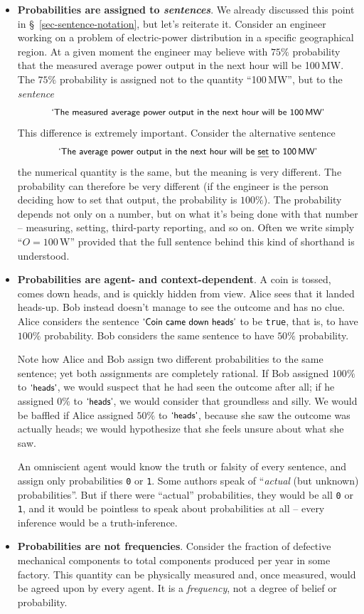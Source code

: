 \documentclass[
  a4paper,
  DIV=11,
  numbers=noendperiod,
  oneside]{scrreprt}
\begin{document}
\begin{itemize}
\item
  {\textbf{ Probabilities are assigned to
  \emph{sentences}}}. We already discussed this point in
  §~\ref{sec-sentence-notation}, but let's reiterate it. Consider an
  engineer working on a problem of electric-power distribution in a
  specific geographical region. At a given moment the engineer may
  believe with \(75\%\) probability that the measured average power
  output in the next hour will be 100\,MW. The \(75\%\) probability is
  assigned not to the quantity ``100\,MW'', but to the \emph{sentence}
  \[
  \textsf{\small`The measured average power output in the next hour will be 100\,MW'}
  \] This difference is extremely important. Consider the alternative
  sentence \[
  \textsf{\small`The average power output in the next hour will be \emph{set} to 100\,MW'}
  \] the numerical quantity is the same, but the meaning is very
  different. The probability can therefore be very different (if the
  engineer is the person deciding how to set that output, the
  probability is \(100\%\)). The probability depends not only on a
  number, but on what it's being done with that number -- measuring,
  setting, third-party reporting, and so on. Often we write simply
  {``\(O = \mathrm{100\,W}\)''} provided that the full sentence behind
  this kind of shorthand is understood.
\item
  {\textbf{ Probabilities are agent- and
  context-dependent}}. A coin is tossed, comes down heads, and is
  quickly hidden from view. Alice sees that it landed heads-up. Bob
  instead doesn't manage to see the outcome and has no clue. Alice
  considers the sentence \(\textsf{\small`Coin came down heads'}\) to be
  \texttt{true}, that is, to have \(100\%\) probability. Bob considers
  the same sentence to have \(50\%\) probability.

  Note how Alice and Bob assign two different probabilities to the same
  sentence; yet both assignments are completely rational. If Bob
  assigned \(100\%\) to \(\textsf{\small`heads'}\), we would suspect
  that he had seen the outcome after all; if he assigned \(0\%\) to
  \(\textsf{\small`heads'}\), we would consider that groundless and
  silly. We would be baffled if Alice assigned \(50\%\) to
  \(\textsf{\small`heads'}\), because she saw the outcome was actually
  heads; we would hypothesize that she feels unsure about what she saw.

  An omniscient agent would know the truth or falsity of every sentence,
  and assign only probabilities \texttt{0} or \texttt{1}. Some authors
  speak of ``\emph{actual} (but unknown) probabilities''. But if there
  were ``actual'' probabilities, they would be all \texttt{0} or
  \texttt{1}, and it would be pointless to speak about probabilities at
  all -- every inference would be a truth-inference.
\item
  {\textbf{ Probabilities are not frequencies}}.
  Consider the fraction of defective mechanical components to total
  components produced per year in some factory. This quantity can be
  physically measured and, once measured, would be agreed upon by every
  agent. It is a \emph{frequency}, not a degree of belief or
  probability.


\end{itemize}
\end{document}
